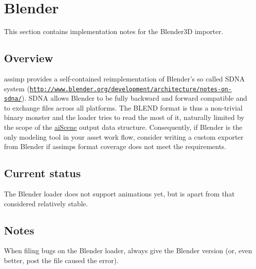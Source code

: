 

 \hypertarget{importer_notes_blender}{}\section{Blender}\label{importer_notes_blender}
This section contains implementation notes for the Blender3\+D importer. \hypertarget{importer_notes_bl_overview}{}\subsection{Overview}\label{importer_notes_bl_overview}
assimp provides a self-\/contained reimplementation of Blender's so called S\+D\+N\+A system (\href{http://www.blender.org/development/architecture/notes-on-sdna/}{\tt http\+://www.\+blender.\+org/development/architecture/notes-\/on-\/sdna/}). S\+D\+N\+A allows Blender to be fully backward and forward compatible and to exchange files across all platforms. The B\+L\+E\+N\+D format is thus a non-\/trivial binary monster and the loader tries to read the most of it, naturally limited by the scope of the \hyperlink{structai_scene}{ai\+Scene} output data structure. Consequently, if Blender is the only modeling tool in your asset work flow, consider writing a custom exporter from Blender if assimps format coverage does not meet the requirements.\hypertarget{importer_notes_bl_status}{}\subsection{Current status}\label{importer_notes_bl_status}
The Blender loader does not support animations yet, but is apart from that considered relatively stable.\hypertarget{importer_notes_bl_notes}{}\subsection{Notes}\label{importer_notes_bl_notes}
When filing bugs on the Blender loader, always give the Blender version (or, even better, post the file caused the error).



